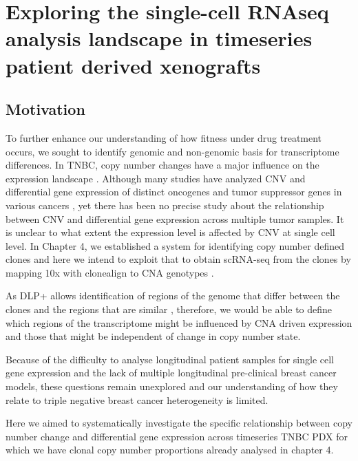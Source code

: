 
{\chapter{Exploring the single-cell RNAseq analysis landscape in timeseries patient derived xenografts}

}
 \label{ch:Chapter5}
 \section{Motivation}


To further enhance our understanding of how fitness under drug treatment occurs, we sought to identify genomic and non-genomic basis for transcriptome differences. 
In TNBC, copy number changes have a major influence on the expression landscape \cite{wang2016integrative}.
Although many studies have analyzed CNV and differential gene expression of distinct oncogenes and tumor suppressor genes in various cancers \cite{kuzyk2015mycn, budczies2016pan, kwak2015fibroblast}, yet there has been no precise study about the relationship between CNV and differential gene expression across multiple tumor samples. It is unclear to what extent the expression level is affected by CNV at single cell level.
In Chapter 4, we established a system for identifying copy number defined clones and here we intend to exploit that to obtain scRNA-seq from the clones by mapping 10x with clonealign to CNA genotypes \cite{campbell2019clonealign}.

As \ac{DLP+} allows identification of regions of the genome that differ between the clones and the regions that are similar \cite{laks2019clonal}, therefore, we would be able to define which regions of the transcriptome might be influenced by CNA driven expression and those that might be independent of change in copy number state.

Because of the difficulty to analyse longitudinal patient samples for single cell gene expression and the lack of multiple longitudinal pre-clinical breast cancer models, these questions remain unexplored and our understanding of how they relate to triple negative breast cancer heterogeneity is limited.

Here we aimed to systematically investigate the specific relationship between copy number change and differential gene expression across timeseries TNBC PDX for which we have clonal copy number proportions already analysed in chapter 4. 

